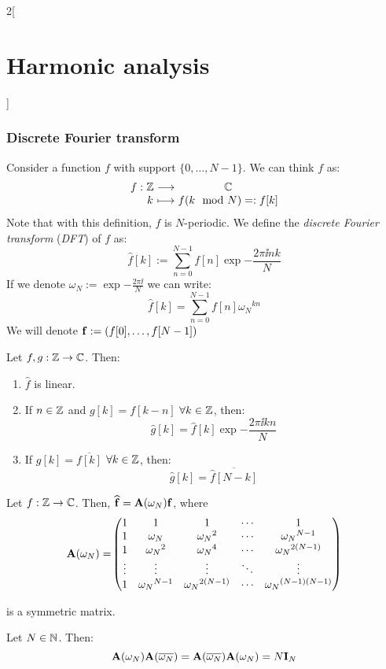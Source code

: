 \documentclass[../../../main_math.tex]{subfiles}
\begin{document}
\begin{multicols}{2}[\section{Harmonic analysis}]
  \subsubsection{Discrete Fourier transform}
  \begin{definition}
    Consider a function $f$ with support $\{0,\ldots,N-1\}$. We can think $f$ as:
    $$\function{f}{\ZZ}{\CC}{k}{f(k\mod{N})=:f[k]}$$
    Note that with this definition, $f$ is $N$-periodic. We define the \emph{discrete Fourier transform} (\emph{DFT}) of $f$ as:
    $$\widehat{f}[k]:=\sum_{n=0}^{N-1}f[n]\exp{-\frac{2\pi\ii nk}{N}}$$
    If we denote $\omega_N:=\exp{-\frac{2\pi\ii}{N}}$ we can write:
    $$\widehat{f}[k]=\sum_{n=0}^{N-1}f[n]{\omega_N}^{kn}$$
    We will denote $\boldsymbol{\mathrm{f}}:=(f[0],\ldots,f[N-1])$
  \end{definition}
  \begin{proposition}
    Let $f,g:\mathbb{Z}\rightarrow\mathbb{C}$. Then:
    \begin{enumerate}
      \item $\widehat{f}$ is linear.
      \item If $n\in\mathbb{Z}$ and $g[k]=f[k-n]$ $\forall k\in\mathbb{Z}$, then: $$\widehat{g}[k]=\widehat{f}[k]\exp{-\frac{2\pi\ii k n}{N}}$$
      \item If $g[k]=\overline{f[k]}$ $\forall k\in\mathbb{Z}$, then: $$\widehat{g}[k]=\overline{\widehat{f}[N-k]}$$
    \end{enumerate}
  \end{proposition}
  \begin{proposition}
    Let $f:\mathbb{Z}\rightarrow\mathbb{C}$. Then, $\boldsymbol{\mathrm{\widehat{f}}}=\boldsymbol{\mathrm{A}}(\omega_N)\boldsymbol{\mathrm{f}}$, where
    $$\boldsymbol{\mathrm{A}}(\omega_N)=\!\begin{pmatrix}
        1      & 1                & 1                   & \cdots & 1                       \\
        1      & \omega_N         & {\omega_N}^2        & \cdots & {\omega_N}^{N-1}        \\
        1      & {\omega_N}^2     & {\omega_N}^4        & \cdots & {\omega_N}^{2(N-1)}     \\
        \vdots & \vdots           & \vdots              & \ddots & \vdots                  \\
        1      & {\omega_N}^{N-1} & {\omega_N}^{2(N-1)} & \cdots & {\omega_N}^{(N-1)(N-1)}
      \end{pmatrix}$$
  \end{proposition}
  is a symmetric matrix.
  \begin{lemma}
    Let $N\in\mathbb{N}$. Then: $$\boldsymbol{\mathrm{A}}(\omega_N)\boldsymbol{\mathrm{A}}(\overline{\omega_N})=\boldsymbol{\mathrm{A}}(\overline{\omega_N})\boldsymbol{\mathrm{A}}(\omega_N)=N\boldsymbol{\mathrm{I}}_N$$

\end{lemma}
\end{multicols}
\end{document}
